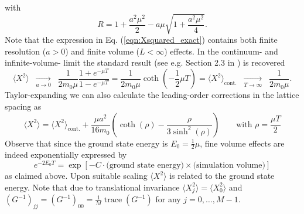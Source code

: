 \documentclass[11pt]{article}
\begin{document}
with
\begin{equation}
R = 1+\frac{a^2\mu^2}{2}-a\mu\sqrt{1+\frac{a^2\mu^2}{4}}.
\end{equation}
Note that the expression in Eq. (\ref{eqn:Xsquared_exact}) contains both finite resolution ($a>0$) and finite volume ($L<\infty$) effects. In the continuum- and infinite-volume- limit the standard result (see e.g. Section 2.3 in \cite{Sakurai1994}) is recovered
\begin{equation}
\langle X^2\rangle\;\; \underset{a\rightarrow 0}{\longrightarrow}\;\;
\frac{1}{2m_0\mu}\frac{1+e^{-\mu T}}{1-e^{-\mu T}}
=\frac{1}{2m_0\mu}\coth\left(-\frac{1}{2}\mu T\right)=\langle X^2\rangle_{\text{cont.}}
\;\; \underset{T\rightarrow \infty}{\longrightarrow}\;\;\frac{1}{2m_0 \mu}.\label{eqn:Xsquared_continuum}
\end{equation}
Taylor-expanding we can also calculate the leading-order corrections in the lattice spacing as
\begin{equation}
  \langle X^2\rangle = \langle X^2\rangle_{\text{cont.}} + \frac{\mu a^2}{16 m_0}\left(\coth\left(\rho\right)-\frac{\rho}{3\sinh^2\left(\rho\right)}\right)
  \qquad\text{with $\rho=\frac{\mu T}{2}$} \label{eqn:finitea_corrections}
\end{equation}
Observe that since the ground state energy is $E_0=\frac{1}{2}\mu$, fine volume effects are indeed exponentially expressed by
\begin{equation}
e^{-2E_0T} = \exp\left[-C\cdot \text{(ground state energy)}\times\text{(simulation volume)}\right]
\end{equation}
as claimed above. Upon suitable scaling $\langle X^2\rangle$ is related to the ground state energy. Note that due to translational invariance $\langle X_j^2\rangle =\langle X_0^2\rangle$ and $\left(G^{-1}\right)_{jj}=\left(G^{-1}\right)_{00}=\frac{1}{M}\operatorname{trace}\left(G^{-1}\right)$ for any $j=0,\dots,M-1$.
\end{document}
